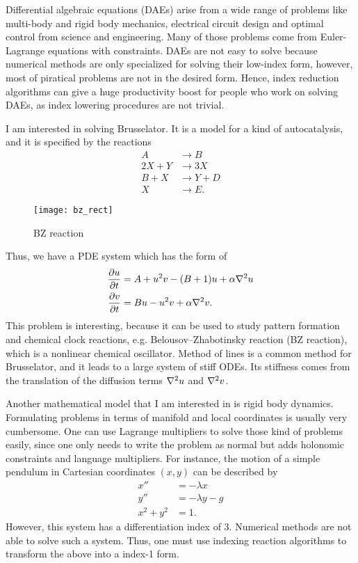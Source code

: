 \documentclass[12pt,a4paper]{article}
\begin{document}
Differential algebraic equations (DAEs) arise from a wide range of problems
like multi-body and rigid body mechanics, electrical circuit design and optimal
control from science and engineering. Many of those problems come from
Euler-Lagrange equations with constraints. DAEs are not easy to solve because
numerical methods are only specialized for solving their low-index form,
however, most of piratical problems are not in the desired form. Hence, index
reduction algorithms can give a huge productivity boost for people who work on
solving DAEs, as index lowering procedures are not trivial.

I am interested in solving Brusselator. It is a model for a kind of
autocatalysis, and it is specified by the reactions
\begin{align*}
  A&\longrightarrow B\\
  2X +  Y&\longrightarrow 3X\\
  B + X&\longrightarrow Y+D\\
  X&\longrightarrow E.
\end{align*}
\begin{wrapfigure}{l}{0.5\textwidth}
  \texttt{[image: bz\_rect]}
  \centering
  \caption{BZ reaction}
\end{wrapfigure}
Thus, we have a PDE system which has the form of
\begin{align}
  \pdv{u}{t} &= A + u^2v - (B+1)u + \alpha \laplacian{u} \\
  \pdv{v}{t} &= Bu - u^2v + \alpha \laplacian{v}.
\end{align}
This problem is interesting, because it can be used to study pattern formation
and chemical clock reactions, e.g. Belousov--Zhabotinsky reaction (BZ
reaction), which is a nonlinear chemical oscillator. Method of lines is a
common method for Brusselator, and it leads to a large system of stiff ODEs.
Its stiffness comes from the translation of the diffusion terms $\laplacian u$
and $\laplacian v$.

Another mathematical model that I am interested in is rigid body dynamics.
Formulating problems in terms of manifold and local coordinates is usually very
cumbersome. One can use Lagrange multipliers to solve those kind of problems
easily, since one only needs to write the problem as normal but adds holonomic
constraints and language multipliers. For instance, the motion of a simple
pendulum in Cartesian coordinates $(x, y)$ can be described by
\begin{align}
  x'' &= -\lambda x \\
  y'' &= -\lambda y - g \\
  x^2 + y^2 &= 1.
\end{align}
However, this system has a differentiation index of 3. Numerical methods are
not able to solve such a system. Thus, one must use indexing reaction
algorithms to transform the above into a index-1 form.
\end{document}
